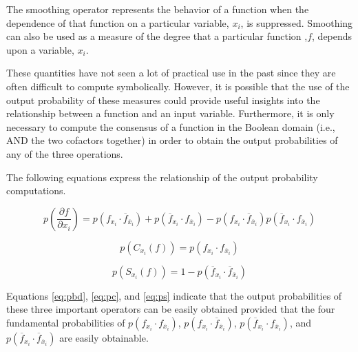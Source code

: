 The smoothing operator represents the behavior of a function when the dependence of that
function on a particular variable, $x_i$, is suppressed.  Smoothing can also be used as a measure
of the degree that a particular function ,$f$, depends upon a variable, $x_i$.

These quantities have not seen a lot of practical use in the past since they are often difficult
to compute symbolically.  However, it is possible that the use of the output probability of these
measures could provide useful insights into the relationship between a function and an input variable.
Furthermore, it is only necessary to compute the consensus of a function in the Boolean domain
(i.e., AND the two cofactors together) in order to obtain the output probabilities of any of the three
operations.

The following equations express the relationship of the output probability computations.

\begin{equation}
p(\frac{\partial{f}}{\partial{x_i}})=p(f_{x_i}\cdot\overline{f}_{\overline{x}_i})+p(\overline{f}_{x_i}\cdot f_{\overline{x}_i})-p(f_{x_i} \cdot \overline{f}_{\overline{x}_i}) p( \overline{f}_{x_i} \cdot f_{\overline{x}_i}) \label{eq:pbd}
\end{equation}

\begin{equation}
p(C_{x_i}(f))=p(f_{x_i} \cdot f_{\overline{x}_i})  \label{eq:pc}
\end{equation}

\begin{equation}
p(S_{x_i}(f))=1-p(\overline{f}_{x_i} \cdot \overline{f}_{\overline{x}_i}) \label{eq:ps}
\end{equation}

Equations \ref{eq:pbd}, \ref{eq:pc}, and \ref{eq:ps} indicate that the output probabilities
of these three important operators can be easily obtained provided that the four fundamental
probabilities of $p(f_{x_i} \cdot f_{\overline{x}_i})$, 
$p(f_{x_i} \cdot \overline{f}_{\overline{x}_i})$,
$p(\overline{f}_{x_i} \cdot f_{\overline{x}_i})$, and 
$p(\overline{f}_{x_i} \cdot \overline{f}_{\overline{x}_i})$ are easily obtainable.
